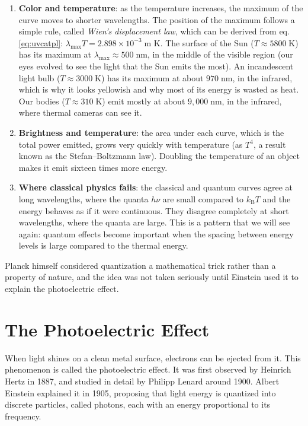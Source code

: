 \documentclass[
  english,
  9pt,
]{extbook}
\theoremstyle{definition}
\theoremstyle{definition}
\theoremstyle{definition}
\theoremstyle{definition}
\theoremstyle{remark}
\begin{document}
\begin{enumerate}
\def\labelenumi{\arabic{enumi}.}
\item
  \textbf{Color and temperature}: as the temperature increases, the maximum of the curve moves to shorter wavelengths. The position of the maximum follows a simple rule, called \emph{Wien's displacement law}, which can be derived from eq. \eqref{eq:uvcatpl}: \(\lambda_\text{max}T = 2.898\times10^{-3}\;\text{m K}\). The surface of the Sun (\(T\approx5800\;\text{K}\)) has its maximum at \(\lambda_\text{max}\approx500\;\text{nm}\), in the middle of the visible region (our eyes evolved to see the light that the Sun emits the most). An incandescent light bulb (\(T\approx3000\;\text{K}\)) has its maximum at about \(970\;\text{nm}\), in the infrared, which is why it looks yellowish and why most of its energy is wasted as heat. Our bodies (\(T\approx310\;\text{K}\)) emit mostly at about \(9{,}000\;\text{nm}\), in the infrared, where thermal cameras can see it.
\item
  \textbf{Brightness and temperature}: the area under each curve, which is the total power emitted, grows very quickly with temperature (as \(T^4\), a result known as the Stefan--Boltzmann law). Doubling the temperature of an object makes it emit sixteen times more energy.
\item
  \textbf{Where classical physics fails}: the classical and quantum curves agree at long wavelengths, where the quanta \(h\nu\) are small compared to \(k_\mathrm{B}T\) and the energy behaves as if it were continuous. They disagree completely at short wavelengths, where the quanta are large. This is a pattern that we will see again: quantum effects become important when the spacing between energy levels is large compared to the thermal energy.
\end{enumerate}

Planck himself considered quantization a mathematical trick rather than a property of nature, and the idea was not taken seriously until Einstein used it to explain the photoelectric effect.

\section{The Photoelectric Effect}\label{the-photoelectric-effect}

When light shines on a clean metal surface, electrons can be ejected from it. This phenomenon is called the photoelectric effect. It was first observed by Heinrich Hertz in 1887, and studied in detail by Philipp Lenard around 1900. Albert Einstein explained it in 1905, proposing that light energy is quantized into discrete particles, called photons, each with an energy proportional to its frequency.
\end{document}
